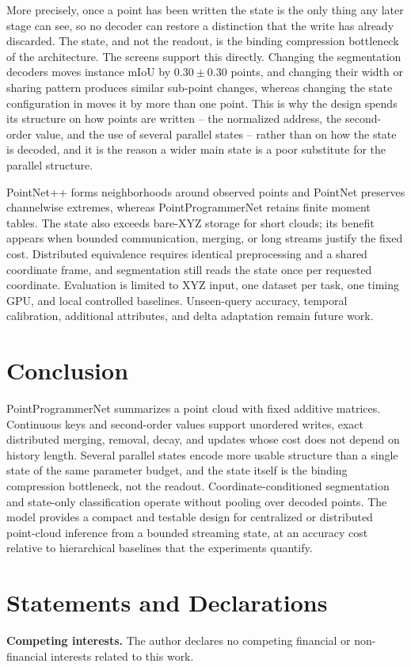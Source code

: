 \documentclass[11pt,a4paper]{article}
\begin{document}
More precisely, once a point has been written the state is the only thing any later stage can see, so no decoder can restore a distinction that the write has already discarded. The state, and not the readout, is the binding compression bottleneck of the architecture. The screens support this directly. Changing the segmentation decoders moves instance mIoU by $0.30\pm0.30$ points, and changing their width or sharing pattern produces similar sub-point changes, whereas changing the state configuration in  moves it by more than one point. This is why the design spends its structure on how points are written -- the normalized address, the second-order value, and the use of several parallel states -- rather than on how the state is decoded, and it is the reason a wider main state is a poor substitute for the parallel structure.

PointNet++ forms neighborhoods around observed points and PointNet preserves channelwise extremes, whereas PointProgrammerNet retains finite moment tables. The state also exceeds bare-XYZ storage for short clouds; its benefit appears when bounded communication, merging, or long streams justify the fixed cost. Distributed equivalence requires identical preprocessing and a shared coordinate frame, and segmentation still reads the state once per requested coordinate. Evaluation is limited to XYZ input, one dataset per task, one timing GPU, and local controlled baselines. Unseen-query accuracy, temporal calibration, additional attributes, and delta adaptation remain future work.

\section{Conclusion}
PointProgrammerNet summarizes a point cloud with fixed additive matrices. Continuous keys and second-order values support unordered writes, exact distributed merging, removal, decay, and updates whose cost does not depend on history length. Several parallel states encode more usable structure than a single state of the same parameter budget, and the state itself is the binding compression bottleneck, not the readout. Coordinate-conditioned segmentation and state-only classification operate without pooling over decoded points. The model provides a compact and testable design for centralized or distributed point-cloud inference from a bounded streaming state, at an accuracy cost relative to hierarchical baselines that the experiments quantify.

\section*{Statements and Declarations}
\noindent\textbf{Competing interests.} The author declares no competing financial
or non-financial interests related to this work.
\end{document}
